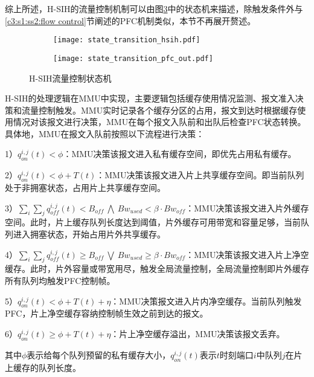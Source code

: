 综上所述，H-SIH的流量控制机制可以由图\ref{c4:s1:ss1:fig:hsih state transition}中的状态机来描述，除触发条件外与\ref{c3:s1:ss2:flow control}节阐述的PFC机制类似，本节不再展开赘述。
\begin{figure}[H]
  \begin{subfigure}[b]{0.49\linewidth}
      \centering
      \texttt{[image: state\_transition\_hsih.pdf]}
      \label{c3:s3:ss4:fig:sub1:hsih ingress queue state transition}
  \end{subfigure}
  \begin{subfigure}[b]{0.49\linewidth}
      \centering
      \texttt{[image: state\_transition\_pfc\_out.pdf]}
      \label{c3:s3:ss4:fig:sub2:hsih egress queue state transition}
  \end{subfigure}
  \caption{H-SIH流量控制状态机}
  \label{c4:s1:ss1:fig:hsih state transition}
\end{figure}


H-SIH的处理逻辑在MMU中实现，主要逻辑包括缓存使用情况监测、报文准入决策和流量控制触发。MMU实时记录各个缓存分区的占用，报文到达时根据缓存使用情况对该报文进行决策，MMU在每个报文入队前和出队后检查PFC状态转换。具体地，MMU在报文入队前按照以下流程进行决策：

1）$q^{i,j}_{on}(t)<\phi$：MMU决策该报文进入私有缓存空间，即优先占用私有缓存。

2）$q^{i,j}_{on}(t)< \phi+T(t)$：MMU决策该报文进入片上共享缓存空间。即当前队列处于非拥塞状态，占用片上共享缓存空间。

3）$\sum_{i}\sum_{j}q^{i,j}_{off}(t) < B_{off} ~\bigwedge~ Bw_{used} < \beta \cdot Bw_{off}$：MMU决策该报文进入片外缓存空间。此时，片上缓存队列长度达到阈值，片外缓存可用带宽和容量足够，当前队列进入拥塞状态，开始占用片外共享缓存。

4）$\sum_{i}\sum_{j}q^{i,j}_{off}(t) \geqslant B_{off} ~\bigvee~ Bw_{used} \geqslant \beta \cdot Bw_{off}$：MMU决策该报文进入片上净空缓存。此时，片外容量或带宽用尽，触发全局流量控制，全局流量控制即片外缓存所有队列均触发PFC控制帧。

5）$q^{i,j}_{on}(t) < \phi +T(t)+\eta$：MMU决策报文进入片内净空缓存。当前队列触发PFC，片上净空缓存容纳控制帧生效之前到达的报文。

6）$q^{i,j}_{on}(t) \geqslant \phi +T(t)+\eta$：片上净空缓存溢出，MMU决策该报文丢弃。

\noindent 其中$\phi$表示给每个队列预留的私有缓存大小，$q^{i,j}_{on}(t)$表示$t$时刻端口$i$中队列$j$在片上缓存的队列长度。

